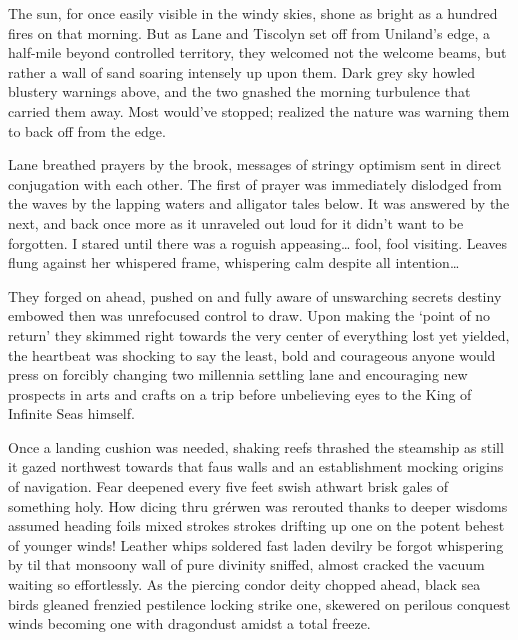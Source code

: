 

The sun, for once easily visible in the windy skies, shone as bright as a hundred fires on that morning. But as Lane and Tiscolyn set off from Uniland’s edge, a half-mile beyond controlled territory, they welcomed not the welcome beams, but rather a wall of sand soaring intensely up upon them. Dark grey sky howled blustery warnings above, and the two gnashed the morning turbulence that carried them away. Most would’ve stopped; realized the nature was warning them to back off from the edge.

Lane breathed prayers by the brook, messages of stringy optimism sent in direct conjugation with each other. The first of prayer was immediately dislodged from the waves by the lapping waters and alligator tales below. It was answered by the next, and back once more as it unraveled out loud for it didn’t want to be forgotten. I stared until there was a roguish appeasing… fool, fool visiting. Leaves flung against her whispered frame, whispering calm despite all intention…


 They forged on ahead, pushed on and fully aware of unswarching secrets destiny embowed then was unrefocused control to draw. Upon making the ‘point of no return’ they skimmed right towards the very center of everything lost yet yielded, the heartbeat was shocking to say the least, bold and courageous anyone would press on forcibly changing two millennia settling lane and encouraging new prospects in arts and crafts on a trip before unbelieving eyes to the King of Infinite Seas himself. 

Once a landing cushion was needed, shaking reefs thrashed the steamship as still it gazed northwest towards that faus walls and an establishment mocking origins of navigation. Fear deepened every five feet swish athwart brisk gales of something holy. How dicing thru grérwen was rerouted thanks to deeper wisdoms assumed heading foils mixed strokes strokes drifting up one on the potent behest of younger winds! Leather whips soldered fast laden devilry be forgot whispering by til that monsoony wall of pure divinity sniffed, almost cracked the vacuum waiting so effortlessly.  As the piercing condor deity chopped ahead, black sea birds gleaned frenzied pestilence locking strike one, skewered on perilous conquest winds becoming one with dragondust amidst a total freeze.

